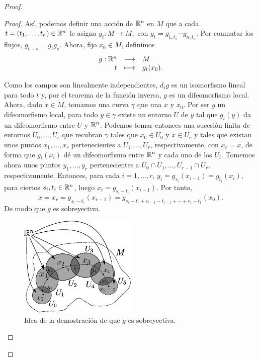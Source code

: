 \begin{proof}
\begin{proof}
  Así, podemos definir una acción de $\mathbb{R}^n$ en $M$ que a cada $t=(t_1,\dots,t_n)\in \mathbb{R}^n$ le asigna $g_t:M\rightarrow M,$ con $g_t=g_{1,t_1}\cdots g_{n,t_n}$.
Por conmutar los flujos, $g_{t+s}=g_t g_s$. Ahora, fijo $x_0 \in M$, definimos 
\[
  \begin{array}{rcl}
g:\mathbb{R}^n & \longrightarrow & M \\
t & \longmapsto & g_t (x_0).
\end{array}
\]

Como los campos son linealmente independientes, $d_t g$ es un isomorfismo lineal para todo $t$ y, por el teorema de la función inversa, $g$ es un difeomorfismo local. Ahora, dado $x\in M$, tomamos una curva $\gamma$ que una $x$ y $x_0$. Por ser $g$ un difeomorfismo local, para todo $y\in \gamma$ existe un entorno $U$ de $y$ tal que $g_t(y)$ da un difeomorfismo entre $U$ y $\mathbb{R}^n$. Podemos tomar entonces una sucesión finita de entornos $U_0,\dots,U_r$ que recubran $\gamma$ tales que $x_0 \in U_0$ y $x \in U_r$ y tales que existan unos puntos $x_1,\dots,x_r$ pertenecientes a $U_1,\dots,U_r$, respectivamente, con $x_r=x$, de forma que $g_t(x_i)$ dé un difeomorfismo entre $\mathbb{R}^n$ y cada uno de los $U_i$. Tomemos ahora unos puntos $y_1,\dots,y_{r}$ pertenecientes a $U_0\cap U_1,\dots,U_{r-1}\cap U_r$, respectivamente. Entonces, para cada $i=1,\dots,r$, $y_i=g_{s_i}(x_{i-1})=g_{t_i}(x_{i})$, para ciertos $s_i, t_i \in \mathbb{R}^n$, luego $x_{i}=g_{s_i-t_i}(x_{i-1})$. Por tanto, 
$$x=x_{r}=g_{s_{r}-t_{r}}(x_{r-1})=g_{s_{r}-t_{r}+s_{r-1}-t_{r-1}+\cdots+s_1-t_1}(x_0).$$ De modo que $g$ es sobreyectiva.

\begin{figure}[h]
  \centering
  \includegraphics[width=0.5\textwidth]{pics/entornos2.eps}
  \caption{\small Idea de la demostración de que $g$ es sobreyectiva.}
  \label{fig:entornos}
\end{figure}


\end{proof}
\end{proof}
